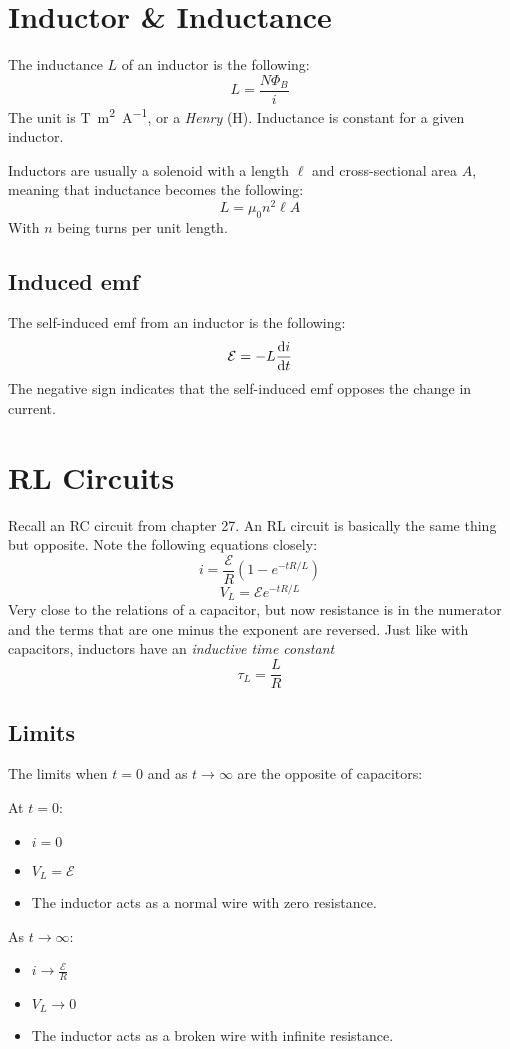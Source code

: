 \documentclass[]{article}
\begin{document}
\section{Inductor \& Inductance}
The inductance $ L $ of an inductor is the following:
\[ L = \frac{N \Phi_B}{i} \]
The unit is \unit{\tesla\meter\squared\per\ampere}, or a \emph{Henry} (\unit{\henry}). Inductance is constant for a given inductor.

Inductors are usually a solenoid with a length $ \ell $ and cross-sectional area $ A $, meaning that inductance becomes the following:
\[ L = \mu_0 n^2 \ell A \]
With $ n $ being turns per unit length.

\subsection{Induced emf}
The self-induced emf from an inductor is the following:
\[ \mathcal{E} = - L \dv{i}{t} \]
The negative sign indicates that the self-induced emf opposes the change in current.

\section{RL Circuits}
Recall an RC circuit from chapter 27. An RL circuit is basically the same thing but opposite. Note the following equations closely:
\[ i = \frac{\mathcal{E}}{R} \left(1 - e^{-tR / L}\right) \]
\[ V_L = \mathcal{E} e^{-tR / L} \]
Very close to the relations of a capacitor, but now resistance is in the numerator and the terms that are one minus the exponent are reversed. Just like with capacitors, inductors have an \emph{inductive time constant}
\[ \tau_L = \frac{L}{R} \]

\subsection{Limits}
The limits when $ t = 0 $ and as $ t \to \infty $ are the opposite of capacitors:

At $ t = 0 $:
\begin{itemize}
  \item $ i = 0 $
  \item $ V_L = \mathcal{E} $
  \item The inductor acts as a normal wire with zero resistance.
\end{itemize}

As $ t \to \infty $:
\begin{itemize}
  \item $ i \to \frac{\mathcal{E}}{R} $
  \item $ V_L \to 0 $
  \item The inductor acts as a broken wire with infinite resistance.
\end{itemize}
\end{document}
